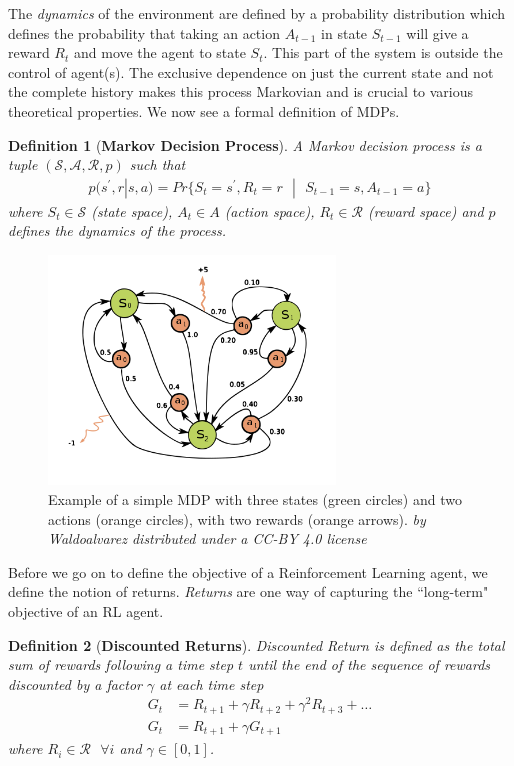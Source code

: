 \documentclass[12pt,a4paper]{article}
\newtheorem{definition}{Definition}
\begin{document}
The \textit{dynamics} of the environment are defined by a probability distribution which defines
the probability that taking an action $A_{t-1}$ in state $S_{t-1}$ will give a reward $R_t$ and
move the agent to state $S_t$. This part of the system is outside the control of agent(s). The
exclusive dependence on just the current state and not the complete history makes this process
Markovian and is crucial to various theoretical properties. We now see a formal definition of
MDPs.

\begin{definition}[\textbf{Markov Decision Process}] \label{def:mdp}
A Markov decision process is a tuple $(\mathcal{S},\mathcal{A}, \mathcal{R}, p)$ such that
\begin{align}
p(s^\prime, r | s, a) = Pr\big\{S_t = s^\prime, R_t = r\text{ }|\text{ }S_{t-1} = s, A_{t-1} = a \big\}
\end{align}
where $S_t \in \mathcal{S}$ (state space), $A_t \in {A}$ (action space), $R_t \in \mathcal{R}$
(reward space) and $p$ defines the dynamics of the process.
\end{definition}

\begin{figure}[ht]
\centering
\includegraphics[width=3in]{mdp}
\caption{Example of a simple MDP with three states (green circles) and two actions (orange 
circles), with two rewards (orange arrows). \textit{by Waldoalvarez distributed under a CC-BY 4.0 
license}} \label{fig:mdp_example}
\end{figure}

Before we go on to define the objective of a Reinforcement Learning agent, we define the notion
of returns. \textit{Returns} are one way of capturing the ``long-term" objective of an RL agent. 

\begin{definition}[\textbf{Discounted Returns}] \label{def:discounted_returns}
Discounted Return is defined as the total sum of rewards following a time step $t$ until the end 
of the sequence of rewards discounted by a factor $\gamma$ at each time step
\begin{align}
G_t &= R_{t+1} + \gamma R_{t+2} + \gamma^2 R_{t+3} + \dotsc \\ \nonumber
G_t &= R_{t+1} + \gamma G_{t+1}
\end{align}
where $R_i \in \mathcal{R}\text{ }\forall i$ and $\gamma \in [0, 1]$.
\end{definition}
\end{document}
